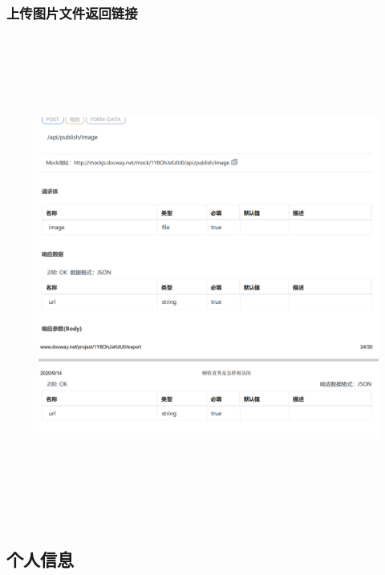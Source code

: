         \subsubsection{上传图片文件返回链接}
        \begin{figure}[h]
            \centering
            \includegraphics[height=16.0cm,width=14.0cm]{design/image/api26.png} 
            \end{figure}  
            \newpage
        \subsection{个人信息}
